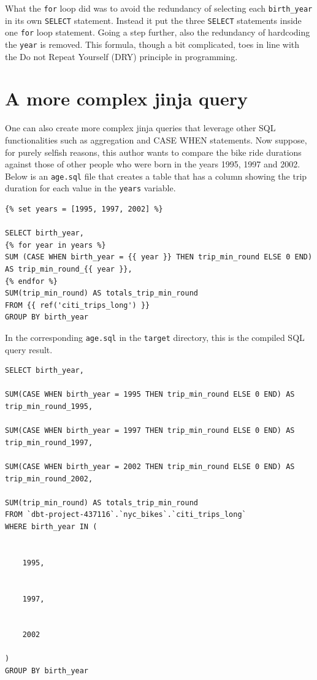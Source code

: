 \documentclass[
]{book}
\begin{document}
What the \texttt{for} loop did was to avoid the redundancy of selecting each \texttt{birth\_year} in its own \texttt{SELECT} statement. Instead it put the three \texttt{SELECT} statements inside one \texttt{for} loop statement. Going a step further, also the redundancy of hardcoding the \texttt{year} is removed. This formula, though a bit complicated, toes in line with the Do not Repeat Yourself (DRY) principle in programming.

\hypertarget{a-more-complex-jinja-query}{%
\section{A more complex jinja query}\label{a-more-complex-jinja-query}}

One can also create more complex jinja queries that leverage other SQL functionalities such as aggregation and CASE WHEN statements. Now suppose, for purely selfish reasons, this author wants to compare the bike ride durations against those of other people who were born in the years 1995, 1997 and 2002. Below is an \texttt{age.sql} file that creates a table that has a column showing the trip duration for each value in the \texttt{years} variable.

\begin{verbatim}
{% set years = [1995, 1997, 2002] %}

SELECT birth_year, 
{% for year in years %}
SUM (CASE WHEN birth_year = {{ year }} THEN trip_min_round ELSE 0 END) AS trip_min_round_{{ year }},
{% endfor %}
SUM(trip_min_round) AS totals_trip_min_round
FROM {{ ref('citi_trips_long') }}
GROUP BY birth_year
\end{verbatim}

In the corresponding \texttt{age.sql} in the \texttt{target} directory, this is the compiled SQL query result.

\begin{verbatim}
SELECT birth_year, 

SUM(CASE WHEN birth_year = 1995 THEN trip_min_round ELSE 0 END) AS trip_min_round_1995,

SUM(CASE WHEN birth_year = 1997 THEN trip_min_round ELSE 0 END) AS trip_min_round_1997,

SUM(CASE WHEN birth_year = 2002 THEN trip_min_round ELSE 0 END) AS trip_min_round_2002,

SUM(trip_min_round) AS totals_trip_min_round
FROM `dbt-project-437116`.`nyc_bikes`.`citi_trips_long`
WHERE birth_year IN (
  
  
    1995, 
  
  
    1997, 
  
  
    2002
  
)
GROUP BY birth_year
\end{verbatim}
\end{document}
